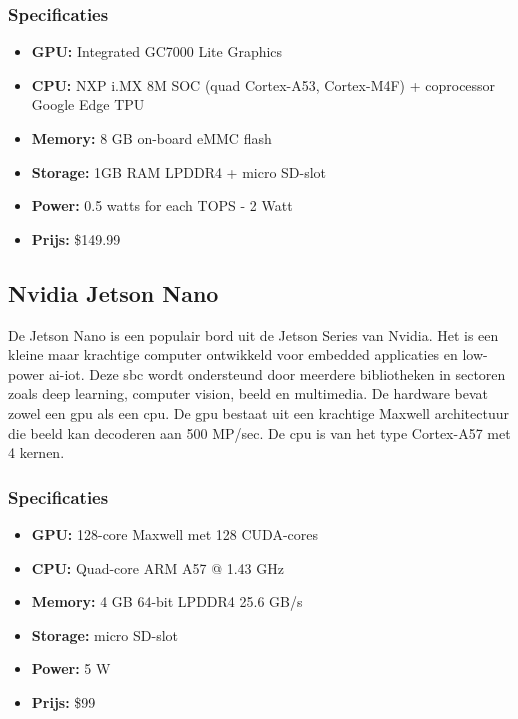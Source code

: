 		\subsubsection{Specificaties}
		\begin{itemize}
			\item \textbf{GPU:} Integrated GC7000 Lite Graphics
			\item \textbf{CPU:} NXP i.MX 8M SOC (quad Cortex-A53, Cortex-M4F) + coprocessor Google Edge TPU
			\item \textbf{Memory:} 8 GB on-board eMMC flash
			\item \textbf{Storage:} 1GB RAM LPDDR4 + micro SD-slot
			\item \textbf{Power:} 0.5 watts for each TOPS - 2 Watt
			\item \textbf{Prijs:} \$149.99
		\end{itemize}
	
	
	\subsection{Nvidia Jetson Nano}
	De Jetson Nano is een populair bord uit de Jetson Series van Nvidia\citep{bron:jetsonnano}. Het is een kleine maar krachtige computer ontwikkeld voor embedded applicaties en low-power \gls{ai}-\gls{iot}. Deze \gls{sbc} wordt ondersteund door meerdere bibliotheken in sectoren zoals deep learning, computer vision, beeld en multimedia. De hardware bevat zowel een \gls{gpu} als een \gls{cpu}. De \gls{gpu} bestaat uit een krachtige Maxwell architectuur die beeld kan decoderen aan 500 MP/sec. De \gls{cpu} is van het type Cortex-A57 met 4 kernen.
	
		\subsubsection{Specificaties}
		\begin{itemize}
			\item \textbf{GPU:} 128-core Maxwell met 128 CUDA-cores
			\item \textbf{CPU:} Quad-core ARM A57 @ 1.43 GHz
			\item \textbf{Memory:} 4 GB 64-bit LPDDR4 25.6 GB/s
			\item \textbf{Storage:}  micro SD-slot
			\item \textbf{Power:} 5 W
			\item \textbf{Prijs:} \$99
		\end{itemize}	
	

